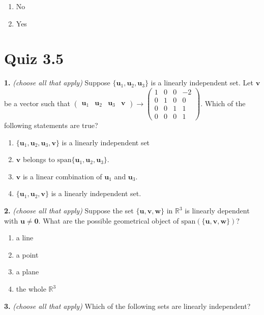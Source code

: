\documentclass[10pt,a4paper]{article}
\begin{document}
\begin{enumerate}[label=(\Alph*)]
\item No
\item Yes
\end{enumerate}
\smallskip
\section{Quiz 3.5}
\textbf{1.} \textit{(choose all that apply)} Suppose \(\{\mathbf{u}_1,\mathbf{u}_2,\mathbf{u}_3\}\) is a linearly independent set. Let \(\mathbf{v}\)  be a vector such that \((\begin{array}{ccc|c}\mathbf{u}_1&\mathbf{u}_2&\mathbf{u}_3&\mathbf{v}\end{array})\longrightarrow\left(\begin{array}{ccc|c}1&0&0&-2\\0&1&0&0\\0&0&1&1\\0&0&0&1\end{array}\right)\). Which of the following statements are true?

\begin{enumerate}[label=(\Alph*)]
\item \(\{​​\mathbf{u}_1,\mathbf{u}_2,\mathbf{u}_3,\mathbf{v}\}\) is a linearly independent set
\item \(\mathbf{v}\)  belongs to \(\text{span}\{​​\mathbf{u}_1,\mathbf{u}_2,\mathbf{u}_3\}\).
\item \(​\mathbf{v}\) is a linear combination of \(\mathbf{u}_1\) and \(\mathbf{u}_3\).
\item \(\{​​\mathbf{u}_1,\mathbf{u}_2,\mathbf{v}\}\) is a linearly independent set.
\end{enumerate}
\smallskip
\textbf{2.} \textit{(choose all that apply)} Suppose the set \(\{\mathbf{u},\mathbf{v},\mathbf{w}\}\) in \(\mathbb{R}^3\) is linearly dependent with \(\mathbf{u}\neq\mathbf{0}\). What are the possible geometrical object of \(\text{span}(\{\mathbf{u},\mathbf{v},\mathbf{w}\})\)?

\begin{enumerate}[label=(\Alph*)]
\item a line
\item a point
\item a plane
\item the whole \(\mathbb{R}^3\)
\end{enumerate}
\smallskip
\textbf{3.} \textit{(choose all that apply)} Which of the following sets are linearly independent?
\end{document}
